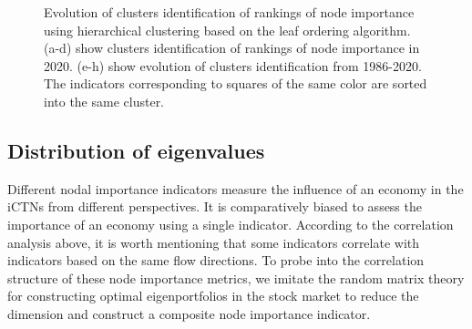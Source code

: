 \documentclass[preprint,3p,times,sort&compress]{elsarticle}
\begin{document}
 \begin{figure}[h!]
     \subfigbottomskip=-1pt
     \subfigcapskip=-5pt
     \centering
      \caption{Evolution of clusters identification of rankings of node importance using hierarchical clustering based on the leaf ordering algorithm. (a-d) show clusters identification of rankings of node importance in 2020. (e-h) show evolution of clusters identification from 1986-2020. The indicators corresponding to squares of the same color are sorted into the same cluster.}
      \label{Fig:iCTN:Cluster}
\end{figure}

 




\subsection{Distribution of eigenvalues}
\label{S3-3:Eigenvalues}


 
Different nodal importance indicators measure the influence of an economy in the iCTNs from different perspectives. It is comparatively biased to assess the importance of an economy using a single indicator. According to the correlation analysis above, it is worth mentioning that some indicators correlate with indicators based on the same flow directions. To probe into the correlation structure of these node importance metrics, we imitate the random matrix theory for constructing optimal eigenportfolios in the stock market to reduce the dimension and construct a composite node importance indicator.
\end{document}
